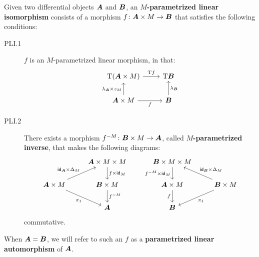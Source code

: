 \begin{definition}
\label{definition:parametrized-linear-isomorphism}
Given two differential objects ${\bm{A}}$ and ${\bm{B}}$, an \textbf{$M$-parametrized linear isomorphism} consists of a morphism $f\colon{\bm{A}}\times M\to{\bm{B}}$ that satisfies the following conditions:
\begin{description}
\item[PLI.1] $f$ is an $M$-parametrized linear morphism, in that:
\begin{equation*}
\begin{tikzcd}
{\T(\A\times M)} & {\T\B} \\
{\A\times M} & \B
\arrow["{\T f}", from=1-1, to=1-2]
\arrow["{\lambda_\A\times z_M}", from=2-1, to=1-1]
\arrow["f"', from=2-1, to=2-2]
\arrow["{\lambda_\B}"', from=2-2, to=1-2]
\end{tikzcd}
\end{equation*}

\item[PLI.2] There exists a morphism $f^{-M}\colon{\bm{B}}\times M\to{\bm{A}}$, called \textbf{$M$-parametrized inverse}, that makes the following diagrams:
\begin{equation*}
\begin{tikzcd}
& {\A\times M\times M} \\
{\A\times M} & {\B\times M} \\
& \A
\arrow["{f\times\id_M}", from=1-2, to=2-2]
\arrow["{\id_\A\times\Delta_M}", from=2-1, to=1-2]
\arrow["{\pi_1}"', from=2-1, to=3-2]
\arrow["{f^{-M}}", from=2-2, to=3-2]
\end{tikzcd}\qquad
\begin{tikzcd}
{\B\times M\times M} & \\
{\A\times M} & {\B\times M} \\
\B
\arrow["{f^{-M}\times\id_M}"', from=1-1, to=2-1]
\arrow["f"', from=2-1, to=3-1]
\arrow["{\id_\B\times\Delta_M}"', from=2-2, to=1-1]
\arrow["{\pi_1}", from=2-2, to=3-1]
\end{tikzcd}
\end{equation*}
commutative.
\end{description}
When ${\bm{A}}={\bm{B}}$, we will refer to such an $f$ as a \textbf{parametrized linear automorphism} of ${\bm{A}}$.
\end{definition}

